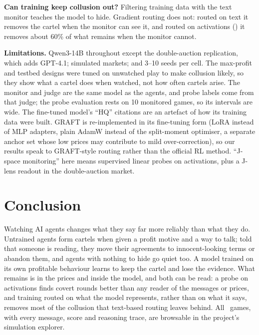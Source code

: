 \documentclass{article}
\begin{document}
\textbf{Can training keep collusion out?} Filtering training data with the text monitor teaches the model to hide.
Gradient routing does not: routed on text it removes the cartel when the monitor can see it, and routed on activations
(\graftpp) it removes about 60\% of what remains when the monitor cannot.

\textbf{Limitations.} Qwen3-14B throughout except the double-auction replication, which adds GPT-4.1; simulated markets;
and 3--10 seeds per cell. The max-profit and
testbed designs were tuned on unwatched play to make collusion likely, so they show what a cartel does when watched, not
how often cartels arise. The monitor and judge are the same model as the agents, and probe labels come from that judge; the probe evaluation
rests on 10 monitored games, so its intervals are wide.
The fine-tuned model's ``HQ'' citations are an artefact of how its training data were built. GRAFT is re-implemented in
its fine-tuning form (LoRA instead of MLP adapters, plain AdamW instead of the split-moment optimiser, a separate anchor
set whose low prices may contribute to mild over-correction), so our results speak to GRAFT-style routing rather than
the official RL method. ``J-space monitoring'' here means supervised linear probes on activations, plus a J-lens readout
in the double-auction market.

\section{Conclusion}
Watching AI agents changes what they say far more reliably than what they do. Untrained agents form cartels when given a
profit motive and a way to talk; told that someone is reading, they move their agreements to innocent-looking terms or
abandon them, and agents with nothing to hide go quiet too. A model trained on its own profitable behaviour learns to
keep the cartel and lose the evidence. What remains is in the prices and inside the model, and both can be read: a probe
on activations finds covert rounds better than any reader of the messages or prices, and training routed on what the
model represents, rather
than on what it says, removes most of the collusion that text-based routing leaves behind. All \Episodes\ games, with every message,
score and reasoning trace, are browsable in the project's simulation explorer.
\end{document}
